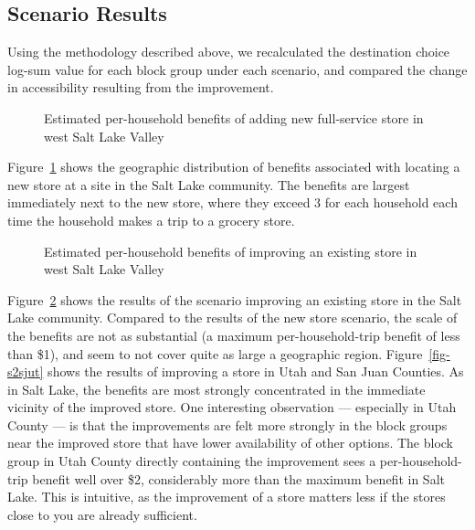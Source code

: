 \documentclass[
  letterpaper,
  number,
  review,
  3p]{elsarticle}
\begin{document}
\subsection{Scenario Results}\label{scenario-results}

Using the methodology described above, we recalculated the destination
choice log-sum value for each block group under each scenario, and
compared the change in accessibility resulting from the improvement.

\begin{figure}


\caption{\label{fig-s1results}Estimated per-household benefits of adding
new full-service store in west Salt Lake Valley}

\end{figure}%

Figure~\ref{fig-s1results} shows the geographic distribution of benefits
associated with locating a new store at a site in the Salt Lake
community. The benefits are largest immediately next to the new store,
where they exceed \(3\) for each household each time the household makes
a trip to a grocery store.

\begin{figure}


\caption{\label{fig-s2results}Estimated per-household benefits of
improving an existing store in west Salt Lake Valley}

\end{figure}%

Figure~\ref{fig-s2results} shows the results of the scenario improving
an existing store in the Salt Lake community. Compared to the results of
the new store scenario, the scale of the benefits are not as substantial
(a maximum per-household-trip benefit of less than \$1), and seem to not
cover quite as large a geographic region. Figure~\ref{fig-s2sjut} shows
the results of improving a store in Utah and San Juan Counties. As in
Salt Lake, the benefits are most strongly concentrated in the immediate
vicinity of the improved store. One interesting observation ---
especially in Utah County --- is that the improvements are felt more
strongly in the block groups near the improved store that have lower
availability of other options. The block group in Utah County directly
containing the improvement sees a per-household-trip benefit well over
\$2, considerably more than the maximum benefit in Salt Lake. This is
intuitive, as the improvement of a store matters less if the stores
close to you are already sufficient.
\end{document}
